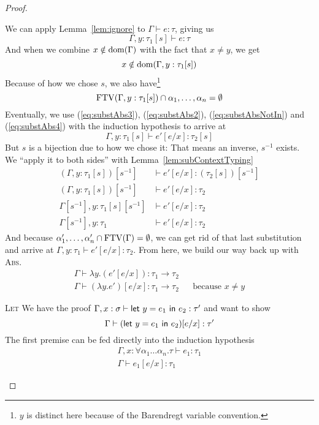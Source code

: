 \begin{proof}
\begin{description}
    We can apply Lemma~\ref{lem:ignore} to $\Gamma \vdash e : \tau$, giving us
    \begin{equation}
      \Gamma , y : \tau_1[s] \vdash e : \tau\label{eq:substAbs3}
    \end{equation}
    And when we combine $x \notin \operatorname{dom}(\Gamma)$ with the fact that $x \ne y$, we get
    \begin{equation}
      x \notin \operatorname{dom}(\Gamma , y : \tau_1[s])
      \label{eq:substAbsNotIn}
    \end{equation}
    Because of how we chose $s$, we also have\footnote{$y$ is distinct
      here because of the Barendregt variable convention.}
    \begin{equation}
      \operatorname{FTV}(\Gamma, y : \tau_1[s]) \cap {\alpha_1,\ldots,\alpha_n} = \emptyset\label{eq:substAbs4}
    \end{equation}
    Eventually, we use (\ref{eq:substAbs3}), (\ref{eq:substAbs2}),
    (\ref{eq:substAbsNotIn}) and (\ref{eq:substAbs4}) with the
    induction hypothesis to arrive at
    \[ \Gamma , y : \tau_1[s] \vdash e' [e/x] : \tau_2[s] \]
    But $s$ is a bijection due to how we chose it: That means an
    inverse, $s^{-1}$ exists. We ``apply it to both sides'' with
    Lemma~\ref{lem:subContextTyping}
    \begin{align*}
      (\Gamma , y : \tau_1[s])[s^{-1}] &\vdash e' [e/x] : (\tau_2[s])[s^{-1}] \\
      (\Gamma , y : \tau_1[s])[s^{-1}] &\vdash e' [e/x] : \tau_2 \\
      \Gamma[s^{-1}] , y : \tau_1[s][s^{-1}] &\vdash e' [e/x] : \tau_2 \\
      \Gamma[s^{-1}], y : \tau_1 &\vdash e' [e/x] : \tau_2
    \end{align*}
    And because $\alpha'_1 , \ldots, \alpha'_n \cap \operatorname{FTV}(\Gamma) = \emptyset$, we can get rid of that
    last substitution and arrive at ${\Gamma, y : \tau_1 \vdash e' [e/x] : \tau_2}$.
    From here, we build our way back up with \textsc{Abs}.
    \begin{align*}
      \Gamma \vdash \lambda y . (e' [e/x]) : \tau_1 \rightarrow \tau_2 \\
      \Gamma \vdash (\lambda y . e')[e/x] : \tau_1 \rightarrow \tau_2 && \text{because } x \ne y
    \end{align*}
    
  \item{\rm\textsc{Let}} We have the proof ${\Gamma , x : \sigma \vdash \mathsf{let} \ y = e_1 \ \mathsf{in} \ e_2 :
      \tau'}$
    and want to show
    \[\Gamma \vdash (\mathsf{let} \ y = e_1 \ \mathsf{in} \ e_2)[e/x] : \tau'\]
    The first premise can be fed directly into the induction hypothesis
    \begin{align}
      \Gamma , x : \forall \alpha_1\ldots\alpha_n . \tau \vdash e_1 : \tau_1 \nonumber \\
      \Gamma \vdash e_1 [e / x] : \tau_1 \label{eq:substLet7}
    \end{align}


\end{description}
\end{proof}
